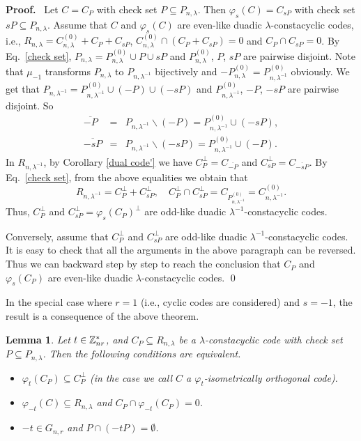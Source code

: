 \documentclass{article}
\newtheorem{Lemma}[Theorem]{Lemma}
\numberwithin{equation}{section}
\numberwithin{table}{section}
\def\Z{{\Bbb Z}}
\def\pf{\par{\bf Proof.}~ }
\def\M{{\varphi}} \def\N{{\psi}} \def\m{{\mu}}
\begin{document}
\pf Let $C=C_P$ with check set $P\subseteq P_{n,\lambda}$.
Then $\M_s(C)=C_{sP}$ with check set $sP\subseteq P_{n,\lambda}$.
Assume that $C$ and $\M_s(C)$ are even-like duadic $\lambda$-constacyclic codes,
i.e., $R_{n,\lambda}=C_{n,\lambda}^{(0)}+C_P+C_{sP}$,
$C_{n,\lambda}^{(0)}\cap(C_P+C_{sP})=0$ and $C_P\cap C_{sP}=0$.
By Eq.~\eqref{check set},
$P_{n,\lambda}=P_{n,\lambda}^{(0)}\cup P\cup sP$ and
$P_{n,\lambda}^{(0)}$, $P$, $sP$ are pairwise disjoint.
Note that $\mu_{-1}$ transforms $P_{n,\lambda}$ to $P_{n,\lambda^{-1}}$
bijectively and $-P_{n,\lambda}^{(0)}=P_{n,\lambda^{-1}}^{(0)}$ obviously.
We get that $P_{n,\lambda^{-1}}=P_{n,\lambda^{-1}}^{(0)}\cup(-P)\cup(-sP)$
and $P_{n,\lambda^{-1}}^{(0)}$, $-P$, $-sP$ are pairwise disjoint. So
\begin{eqnarray*}
\overline{-P}&=&P_{n,\lambda^{-1}}\backslash(-P)=
P_{n,\lambda^{-1}}^{(0)}\cup(-sP),\\
\overline{-sP}&=&P_{n,\lambda^{-1}}\backslash(-sP)=
P_{n,\lambda^{-1}}^{(0)}\cup(-P).
\end{eqnarray*}
In $R_{n,\lambda^{-1}}$,  by Corollary \ref{dual code'} we have
$C_P^{\bot}=C_{\overline{-P}}$ and $C_{sP}^\bot=C_{\overline{-sP}}$.
By Eq.~\eqref{check set}, from the above equalities we obtain that
$$
R_{n,\lambda^{-1}}=C_P^{\bot}+C_{sP}^\bot,\quad
C_P^{\bot}\cap C_{sP}^\bot=C_{P_{n,\lambda^{-1}}^{(0)}}
=C_{n,\lambda^{-1}}^{(0)}.
$$
Thus, $C_P^{\bot}$ and $C_{sP}^\bot=\M_s(C_P)^\bot$ are odd-like duadic
$\lambda^{-1}$-constacyclic codes.

Conversely, assume that $C_P^{\bot}$ and $C_{sP}^\bot$ are odd-like duadic
$\lambda^{-1}$-constacyclic codes. It is easy to check that
all the arguments in the above paragraph can be reversed.
Thus we can backward step by step to reach the conclusion that
$C_P$ and $\M_s(C_P)$ are even-like duadic $\lambda$-constacyclic codes.
\qed\smallskip

In the special case where $r=1$ (i.e., cyclic codes are considered) and $s=-1$,
the result \cite[Th. 6.4.2]{HP} is a consequence of the above theorem.

\begin{Lemma}\label{s-iso}
Let $t\in\Z_{nr}^*$, and
$C_P\subseteq R_{n,\lambda}$ be a $\lambda$-constacyclic code
with check set $P\subseteq P_{n,\lambda}$.
Then the following conditions are equivalent.
\begin{itemize}
\item[(i)]
$\M_t(C_P)\subseteq C_P^\bot$ (in the case we call $C$ a
 {\em $\M_t$-isometrically orthogonal code}).
\item[(ii)]
$\M_{-t}(C)\subseteq R_{n,\lambda}$ and $C_P\cap\M_{-t}(C_P)=0$.
\item[(iii)]
$-t\in G_{n,r}$ and $P\cap (-tP)=\emptyset$.
\end{itemize}
\end{Lemma}
\end{document}
